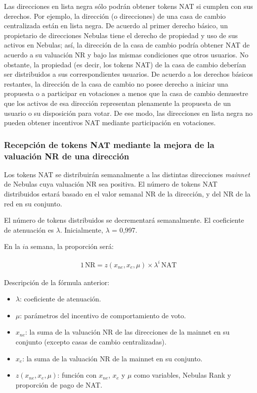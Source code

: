 Las direcciones en lista negra sólo podrán obtener tokens NAT si cumplen con sus derechos. Por ejemplo, la dirección (o direcciones) de una casa de cambio centralizada están en lista negra. De acuerdo al primer derecho básico, un propietario de direcciones Nebulas tiene el derecho de propiedad y uso de sus activos en Nebulas; así, la dirección de la casa de cambio podría obtener NAT de acuerdo a su valuación NR y bajo las mismas condiciones que otros usuarios. No obstante, la propiedad (es decir, los tokens NAT) de la casa de cambio deberían ser distribuidos a sus correspondientes usuarios. De acuerdo a los derechos básicos restantes, la dirección de la casa de cambio no posee derecho a iniciar una propuesta o a participar en votaciones a menos que la casa de cambio demuestre que los activos de esa dirección representan plenamente la propuesta de un usuario o su disposición para votar. De ese modo, las direcciones en lista negra no pueden obtener incentivos NAT mediante participación en votaciones.

\subsubsection{Recepción de tokens NAT mediante la mejora de la valuación NR de una dirección}

Los tokens NAT se distribuirán semanalmente a las distintas direcciones \textit{mainnet} de Nebulas cuya valuación NR sea positiva. El número de tokens NAT distribuidos estará basado en el valor semanal NR de la dirección, y del NR de la red en su conjunto.

El número de tokens distribuidos se decrementará semanalmente. El coeficiente de atenuación es $\lambda$. Inicialmente, $\lambda$ = 0,997.

En la $i$a semana, la proporción será:

\begin{align}
1\,\text{NR}=z(x_{ne},x_{e},\mu)\times\lambda^{i}\,\text{NAT}
\end{align}

Descripción de la fórmula anterior:

\begin{itemize}
	\item $\lambda$: coeficiente de atenuación.
	\item $\mu$: parámetros del incentivo de comportamiento de voto.
	\item $x_{ne}$: la suma de la valuación NR de las direcciones de la mainnet en su conjunto (excepto casas de cambio centralizadas).
	\item $x_{e}$: la suma de la valuación NR de la mainnet en su conjunto.
	\item $z(x_{ne},x_{e},\mu)$: función con $x_{ne}$, $x_{e}$ y $\mu$ como variables, Nebulas Rank y proporción de pago de NAT.
\end{itemize}

